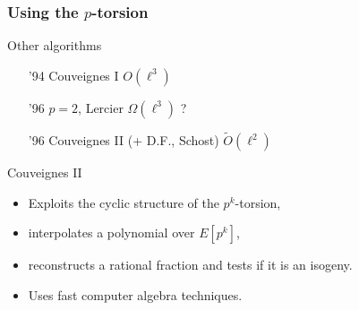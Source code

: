 \documentclass[10pt]{beamer}
\newcommand{\0}{\mathcal{O}}  %
\newcommand{\tildO}{\tilde{O}}  %
\begin{document}

\begin{frame}
  \frametitle{Using the $p$-torsion}

  \begin{block}{Other algorithms}
    \begin{itemize}
    \item['94] Couveignes I \hfill $O(\ell^3)$
    \item['96] $p=2$, Lercier \hfill $\Omega(\ell^3)$ ?
    \item['96] Couveignes II (+ D.F., Schost) \hfill $\tildO(\ell^2)$
    \end{itemize}
  \end{block}
  
  \begin{block}{Couveignes II}
    \begin{itemize}
    \item Exploits the cyclic structure of the $p^k$-torsion,
    \item interpolates a polynomial over $E[p^k]$,
    \item reconstructs a rational fraction and tests if it is an isogeny.
    \item Uses fast computer algebra techniques.
    \end{itemize}
  \end{block}
\end{frame}

\end{document}
